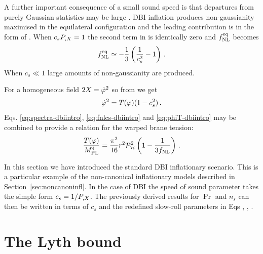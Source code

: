 A further important consequence of a small sound speed is that departures  
from purely Gaussian statistics may be large 
\cite{brane6,brane11,lidser3,chenetal}. 
DBI inflation produces non-gaussianity maximised in the equilateral
configuration and the leading contribution is in the form of
. 
When $c_sP_{,X}=1$ the second term in 
 is identically zero and $f_{\mathrm{NL}}^{\mathrm{eq}}$ becomes
\cite{chenetal,lidser2}
% 
\begin{equation}
\label{eq:fnlcs-dbiintro}
f_{\mathrm{NL}}^{\mathrm{eq}} \simeq -\frac{1}{3} \left( \frac{1}{c_s^2} -1 \right) \,.
\end{equation}
% 
When $c_s\ll1$ large amounts of non-gaussianity are produced.

For a homogeneous field $2X = \dot{\varphi}^2$ so from  we
get
\begin{equation}
\label{eq:phiT-dbiintro}
 \dot{\varphi}^2 = T(\varphi)(1-c_s^2)\,.
\end{equation}
Eqs. \eqref{eq:spectra-dbiintro},
\eqref{eq:fnlcs-dbiintro} and \eqref{eq:phiT-dbiintro}
may be combined to provide a relation for the warped brane tension: 
% 
\begin{equation}
\label{eq:obswarp-dbiintro}
\frac{T (\varphi)}{M_{\mathrm{PL}}^4}  = 
\frac{\pi^2}{16} r^2\mathcal{P}_{\mathcal{R}}^2  \left( 1-\frac{1}{3f_{\mathrm{NL}}} \right) \,.
\end{equation}
% 

In this section we have introduced the standard DBI inflationary scenario. This
is a particular example of the non-canonical inflationary models described in
Section~\ref{sec:noncanoninfl}. In the case of DBI the speed of sound parameter
takes the simple form $c_s = 1/P_{,X}$. The previously derived
results for $\Pr$ and $n_s$ can then be written in terms of $c_s$ and the
redefined slow-roll parameters in Eqs ,
, . 

\section{The Lyth bound}
\label{sec:lyth-dbiintro}

